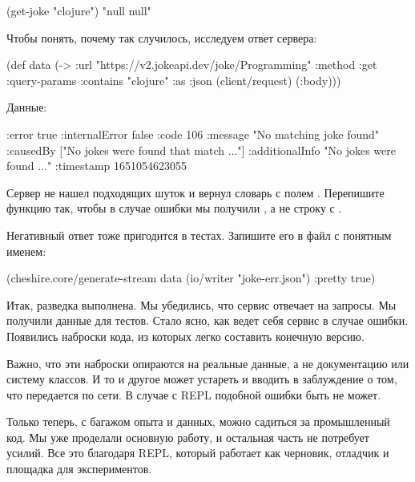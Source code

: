 \begin{english}
  \begin{clojure}
(get-joke "clojure")
"null null"
  \end{clojure}
\end{english}

Чтобы понять, почему так случилось, исследуем ответ сервера:

\begin{english}
  \begin{clojure}
(def data
  (-> {:url "https://v2.jokeapi.dev/joke/Programming"
       :method :get
       :query-params {:contains "clojure"}
       :as :json}
      (client/request)
      (:body)))
  \end{clojure}
\end{english}

Данные:

\begin{english}
  \begin{clojure}
{:error true
 :internalError false
 :code 106
 :message "No matching joke found"
 :causedBy ["No jokes were found that match ..."]
 :additionalInfo "No jokes were found ..."
 :timestamp 1651054623055}
  \end{clojure}
\end{english}

Сервер не нашел подходящих шуток и вернул словарь с полем . Перепишите функцию так, чтобы в случае ошибки мы получили , а не строку с .

Негативный ответ тоже пригодится в тестах. Запишите его в файл с понятным именем:

\begin{english}
  \begin{clojure}
(cheshire.core/generate-stream
  data
  (io/writer "joke-err.json")
  {:pretty true})
  \end{clojure}
\end{english}

Итак, разведка выполнена. Мы убедились, что сервис отвечает на запросы. Мы получили данные для тестов. Стало ясно, как ведет себя сервис в случае ошибки. Появились наброски кода, из которых легко составить конечную версию.

Важно, что эти наброски опираются на реальные данные, а не документацию или систему классов. И то и другое может устареть и вводить в заблуждение о том, что передается по сети. В случае с REPL подобной ошибки быть не может.

Только теперь, с багажом опыта и данных, можно садиться за промышленный код. Мы уже проделали основную работу, и остальная часть не потребует усилий. Все это благодаря REPL, который работает как черновик, отладчик и площадка для экспериментов.

